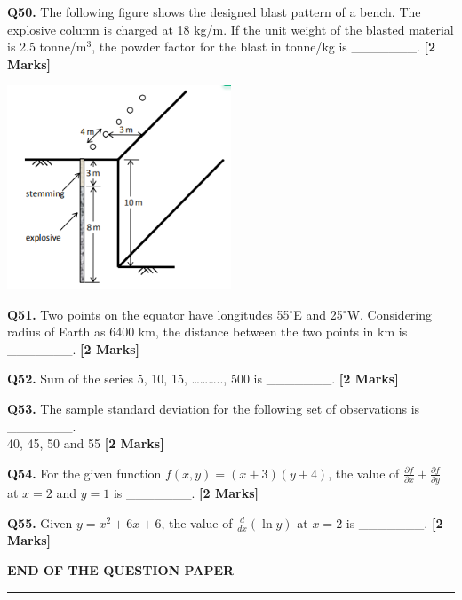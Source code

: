 \documentclass[11pt]{article}
\newcommand{\questionb}[2]{
    \noindent\textbf{Q#2.} #1 \hfill \textbf{[2 Marks]}
}
\begin{document}
\questionb{The following figure shows the designed blast pattern of a bench. The explosive column is charged at 18 kg/m. If the unit weight of the blasted material is 2.5 tonne/m\(^3\), the powder factor for the blast in tonne/kg is \_\_\_\_\_\_\_.}{50}
\begin{center}
\includegraphics[width=0.5\textwidth]{figures/50.png}
\end{center}
\vspace{0.5cm}

\questionb{Two points on the equator have longitudes 55\(^\circ\)E and 25\(^\circ\)W. Considering radius of Earth as 6400 km, the distance between the two points in km is \_\_\_\_\_\_\_.}{51}
\vspace{0.5cm}

\questionb{Sum of the series 5, 10, 15, ……….., 500 is \_\_\_\_\_\_\_.}{52}
\vspace{0.5cm}

\questionb{The sample standard deviation for the following set of observations is \_\_\_\_\_\_\_.\\
40, 45, 50 and 55}{53}
\vspace{0.5cm}

\questionb{For the given function \(f(x, y) = (x + 3)(y + 4)\), the value of \(\frac{\partial f}{\partial x} + \frac{\partial f}{\partial y}\) at \(x = 2\) and \(y = 1\) is \_\_\_\_\_\_\_.}{54}
\vspace{0.5cm}

\questionb{Given \(y = x^2 + 6x + 6\), the value of \(\frac{d}{dx} (\ln y)\) at \(x = 2\) is \_\_\_\_\_\_\_.}{55}
\vspace{0.5cm}

\vspace{5cm}
\begin{center}
\textbf{END OF THE QUESTION PAPER} \\
\rule{\textwidth}{0.5pt}
\end{center}
\end{document}
